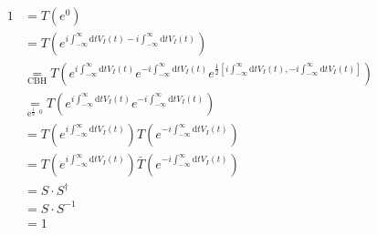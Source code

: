 \documentclass[12pt, titlepage]{article}
\begin{document}
\begin{subequations}
\begin{flalign}
1
&=
T
\left( 
e^{0}
\right) 
		&\\
		&=
		T
	\left( 
	e^{i\int_{-\infty}^{\infty}\mathrm{d}t V_{I}(t)
	-i\int_{-\infty}^{\infty}\mathrm{d}t V_{I}(t)
	}
	\right) 
			&\\
		 &\underset{\mathrm{CBH}}{=} 
		T
	\left( 
	e^{i\int_{-\infty}^{\infty}\mathrm{d}t V_{I}(t)
	}	
	e^{
	-i\int_{-\infty}^{\infty}\mathrm{d}t V_{I}(t)
	}
	e^{\frac{1}{2}\left[ i\int_{-\infty}^{\infty}\mathrm{d}t V_{I}(t),
	-i\int_{-\infty}^{\infty}\mathrm{d}t V_{I}(t)
	\right] 
	}
	\right) 
		&\\
		&\underset{\mathrm{e^{\frac{1}{2}\cdot 0}}}{=} 
		T
	\left( 
	e^{i\int_{-\infty}^{\infty}\mathrm{d}t V_{I}(t)
	}	
	e^{
	-i\int_{-\infty}^{\infty}\mathrm{d}t V_{I}(t)
	}
	\right) 		
		&\\
		&=	
				T
	\left( 
	e^{i\int_{-\infty}^{\infty}\mathrm{d}t V_{I}(t)
	}	
	\right) 	
	T
	\left(
	e^{
	-i\int_{-\infty}^{\infty}\mathrm{d}t V_{I}(t)
	}
	\right) 	
		&\\
		&=	
				T
	\left( 
	e^{i\int_{-\infty}^{\infty}\mathrm{d}t V_{I}(t)
	}	
	\right) 	
	\bar{T}
	\left(
	e^{
	-i\int_{-\infty}^{\infty}\mathrm{d}t V_{I}(t)
	}
	\right) 	
	&\\
	&=	S \cdot S^{\dagger}
	&\\
	&=	S \cdot S^{-1}	
	&\\
	&=	1
\end{flalign}
\end{subequations}
\end{document}
